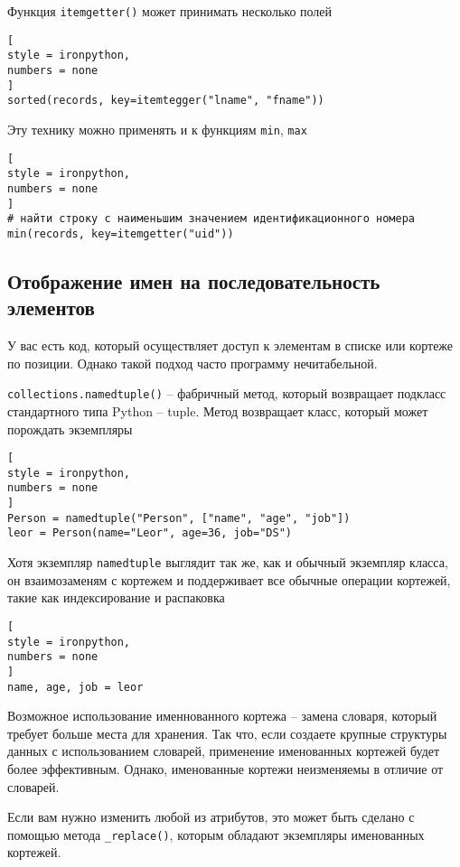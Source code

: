 \documentclass[%
	11pt,
	a4paper,
	utf8,
		]{article}
\begin{document}
Функция \texttt{itemgetter()} может принимать несколько полей
\begin{lstlisting}[
style = ironpython,
numbers = none
]
sorted(records, key=itemtegger("lname", "fname"))
\end{lstlisting}

Эту технику можно применять и к функциям \texttt{min}, \texttt{max}
\begin{lstlisting}[
style = ironpython,
numbers = none
]
# найти строку с наименьшим значением идентификационного номера
min(records, key=itemgetter("uid"))
\end{lstlisting}

\subsection{Отображение имен на последовательность элементов}

У вас есть код, который осуществляет доступ к элементам в списке или кортеже по позиции. Однако такой подход часто программу нечитабельной. 

\texttt{collections.namedtuple()} -- фабричный метод, который возвращает подкласс стандартного типа Python -- tuple. Метод возвращает класс, который может порождать экземпляры
\begin{lstlisting}[
style = ironpython,
numbers = none
]
Person = namedtuple("Person", ["name", "age", "job"])
leor = Person(name="Leor", age=36, job="DS")
\end{lstlisting}

Хотя экземпляр \texttt{namedtuple} выглядит так же, как и обычный экземпляр класса, он взаимозаменям с кортежем и поддерживает все обычные операции кортежей, такие как индексирование и распаковка
\begin{lstlisting}[
style = ironpython,
numbers = none	
]
name, age, job = leor
\end{lstlisting}

Возможное использование именнованного кортежа -- замена словаря, который требует больше места для хранения. Так что, если создаете крупные структуры данных с использованием словарей, применение именованных кортежей будет более эффективным. Однако, именованные кортежи неизменяемы в отличие от словарей.

Если вам нужно изменить любой из атрибутов, это может быть сделано с помощью метода \verb|_replace()|, которым обладают экземпляры именованных кортежей.
\end{document}
